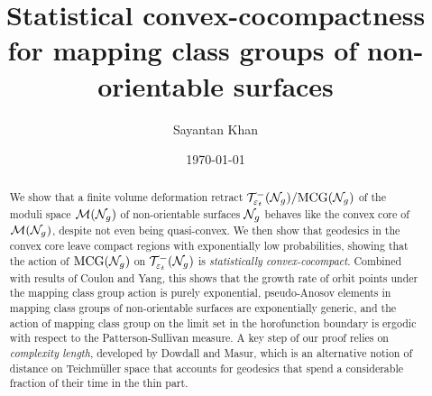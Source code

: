 \documentclass[12pt, reqno]{amsart}
\title[Statistical convex-cocompactness for non-orientable mapping class groups]{Statistical convex-cocompactness for mapping class groups of non-orientable surfaces}
\author{Sayantan Khan}
\date{\today}
\begin{document}
\begin{abstract}
  We show that a finite volume deformation retract $\mathcal{T}_{\varepsilon_t}^{-}(\mathcal{N}_g)/\mathrm{MCG}(\mathcal{N}_g)$ of the moduli space $\mathcal{M}(\mathcal{N}_g)$ of non-orientable surfaces $\mathcal{N}_g$ behaves like the convex core of $\mathcal{M}(\mathcal{N}_g)$, despite not even being quasi-convex.
  We then show that geodesics in the convex core leave compact regions with exponentially low probabilities, showing that the action of $\mathrm{MCG}(\mathcal{N}_g)$ on $\mathcal{T}_{\varepsilon_t}^{-}(\mathcal{N}_g)$ is \emph{statistically convex-cocompact}.
  Combined with results of Coulon and Yang, this shows that the growth rate of orbit points under the mapping class group action is purely exponential, pseudo-Anosov elements in mapping class groups of non-orientable surfaces are exponentially generic, and the action of mapping class group on the limit set in the horofunction boundary is ergodic with respect to the Patterson-Sullivan measure.
  A key step of our proof relies on \emph{complexity length}, developed by Dowdall and Masur, which is an alternative notion of distance on Teichmüller space that accounts for geodesics that spend a considerable fraction of their time in the thin part.
\end{abstract}
\maketitle












\appendix



\printbibliography
\end{document}
